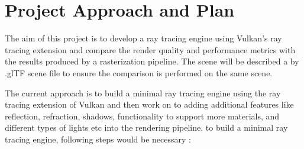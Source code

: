\documentclass[conference]{IEEEtran}
\begin{document}

\section{Project Approach and Plan} \label{project-approach}
The aim of this project is to develop a ray tracing engine using Vulkan's ray tracing extension and compare the render quality and performance metrics with the results produced by a rasterization pipeline. The scene will be described a by .glTF scene file to ensure the comparison is performed on the same scene.

The current approach is to build a minimal ray tracing engine using the ray tracing extension of Vulkan and then work on to adding additional features like reflection, refraction, shadows, functionality to support more materials, and different types of lights etc into the rendering pipeline. to build a minimal ray tracing engine, following steps would be necessary \cite{NVIDIA_Vulkan_Ray_Tracing_Tutorial,Examination_RTX}: 
\end{document}
